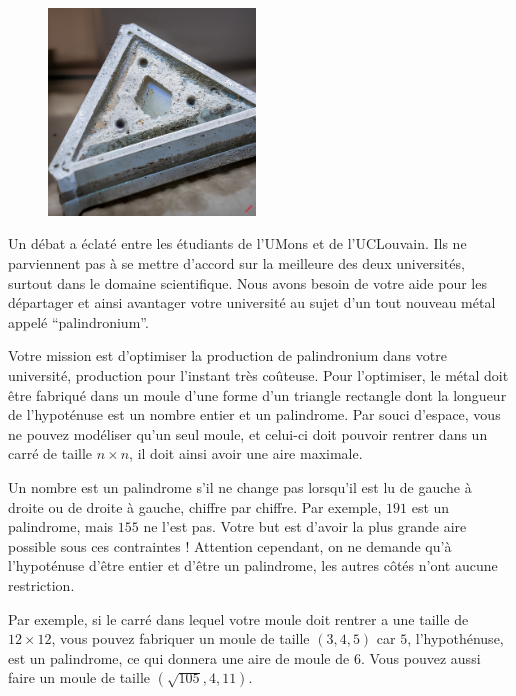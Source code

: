 \problemname{\problemyamlname}

\begin{figure}
    \centering
    \includegraphics[width=5.5cm]{palindromium.jpg}
\end{figure}
Un débat a éclaté entre les étudiants de l'UMons et de l'UCLouvain.
Ils ne parviennent pas à se mettre d'accord sur la meilleure des deux universités, surtout dans le domaine scientifique.
Nous avons besoin de votre aide pour les départager et ainsi avantager votre université au sujet d'un tout nouveau métal appelé ``palindronium''.

Votre mission est d'optimiser la production de palindronium dans votre université, production pour l'instant très coûteuse.
Pour l'optimiser, le métal doit être fabriqué dans un moule d'une forme d'un triangle rectangle dont la longueur de l'hypoténuse est un nombre entier et un palindrome.
Par souci d'espace, vous ne pouvez modéliser qu'un seul moule, et celui-ci doit pouvoir rentrer dans un carré de taille $n \times n$, il doit ainsi avoir une aire maximale.

Un nombre est un palindrome s'il ne change pas lorsqu'il est lu de gauche à droite ou de droite à gauche, chiffre par chiffre.
Par exemple, $191$ est un palindrome, mais $155$ ne l'est pas.
Votre but est d'avoir la plus grande aire possible sous ces contraintes ! Attention cependant, on ne demande qu'à l'hypoténuse d'être entier et d'être un palindrome, les autres côtés n'ont aucune restriction.

Par exemple, si le carré dans lequel votre moule doit rentrer a une taille de $12 \times 12$, vous pouvez fabriquer un moule de taille $(3,4,5)$ car $5$, l'hypothénuse, est un palindrome, ce qui donnera une aire de moule de $6$. Vous pouvez aussi faire un moule de taille $(\sqrt{105},4,11)$.

